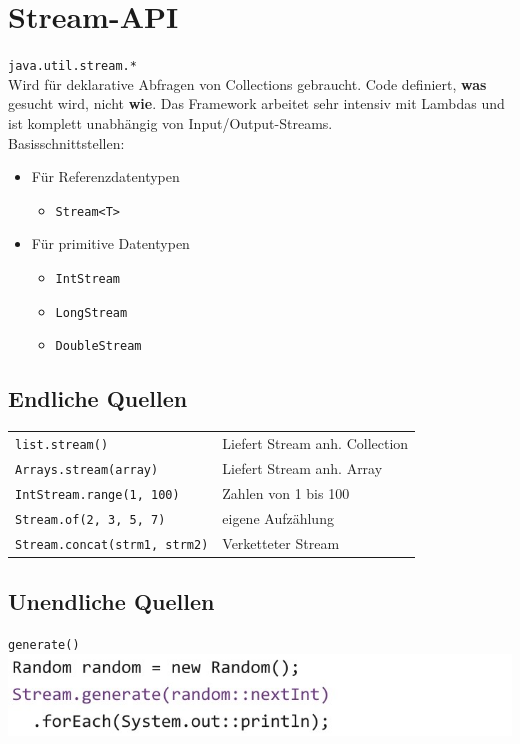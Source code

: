 \section{Stream-API}
\verb|java.util.stream.*|\\
Wird für deklarative Abfragen von Collections gebraucht. Code definiert, \textbf{was} gesucht wird, nicht \textbf{wie}.
Das Framework arbeitet sehr intensiv mit Lambdas und ist komplett unabhängig von Input/Output-Streams.\\
Basisschnittstellen:
\begin{itemize}
    \itemsep0em
    \item Für Referenzdatentypen
    \begin{itemize}
        \item \verb|Stream<T>|
    \end{itemize}
    \item Für primitive Datentypen
    \begin{itemize}
        \itemsep0em
        \item \verb|IntStream|
        \item \verb|LongStream|
        \item \verb|DoubleStream|
    \end{itemize}
\end{itemize}

\subsection{Endliche Quellen}
\begin{tabular}{l l}
    \verb|list.stream()              | & Liefert Stream anh. Collection \\
    \verb|Arrays.stream(array)       | & Liefert Stream anh. Array \\
    \verb|IntStream.range(1, 100)    | & Zahlen von 1 bis 100 \\
    \verb|Stream.of(2, 3, 5, 7)      | & eigene Aufzählung \\
    \verb|Stream.concat(strm1, strm2)| & Verketteter Stream \\
\end{tabular}

\subsection{Unendliche Quellen}
\verb|generate()| \\
\includegraphics[width=0.7\linewidth]{pictures/generate.jpg}

